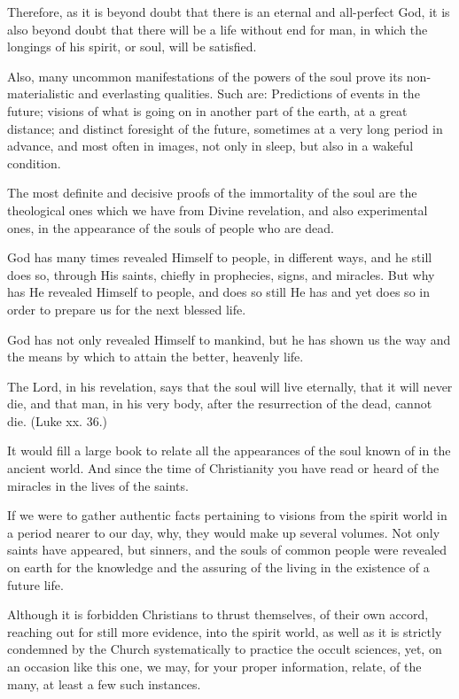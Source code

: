 Therefore, as it is beyond doubt that there is an eternal and all-perfect God, it is also beyond doubt that there will be a life without end for man, in which the longings of his spirit, or soul, will be satisfied.

Also, many uncommon manifestations of the powers of the soul prove its non-materialistic and everlasting qualities. Such are: Predictions of events in the future; visions of what is going on in another part of the earth, at a great distance; and distinct foresight of the future, sometimes at a very long period in advance, and most often in images, not only in sleep, but also in a wakeful condition.

The most definite and decisive proofs of the immortality of the soul are the theological ones which we have from Divine revelation, and also experimental ones, in the appearance of the souls of people who are dead.

God has many times revealed Himself to people, in different ways, and he still does so, through His saints, chiefly in prophecies, signs, and miracles. But why has He revealed Himself to people, and does so still He has and yet does so in order to prepare us for the next blessed life.

God has not only revealed Himself to mankind, but he has shown us the way and the means by which to attain the better, heavenly life.

The Lord, in his revelation, says that the soul will live eternally, that it will never die, and that man, in his very body, after the resurrection of the dead, cannot die. (Luke xx. 36.)

It would fill a large book to relate all the appearances of the soul known of in the ancient world. And since the time of Christianity you have read or heard of the miracles in the lives of the saints.

If we were to gather authentic facts pertaining to visions from the spirit world in a period nearer to our day, why, they would make up several volumes. Not only saints have appeared, but sinners, and the souls of common people were revealed on earth for the knowledge and the assuring of the living in the existence of a future life.

Although it is forbidden Christians to thrust themselves, of their own accord, reaching out for still more evidence, into the spirit world, as well as it is strictly condemned by the Church systematically to practice the occult sciences, yet, on an occasion like this one, we may, for your proper information, relate, of the many, at least a few such instances.

